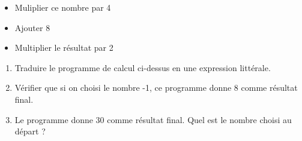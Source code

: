 \documentclass[exercice]{thedocument}%
\begin{document}
%
    \begin{mdframed}
        \begin{itemize}
            \item Muliplier ce nombre par 4
            \item Ajouter 8
            \item Multiplier le résultat par 2
        \end{itemize}
    \end{mdframed}
    \begin{enumerate}
        \item Traduire le programme de calcul ci-dessus en une expression
        littérale.
        \item Vérifier que si on choisi le nombre -1, ce programme donne 8 comme
        résultat final.
        \item Le programme donne 30 comme résultat final. Quel est le nombre
        choisi au départ ?
    \end{enumerate}
\end{document}
